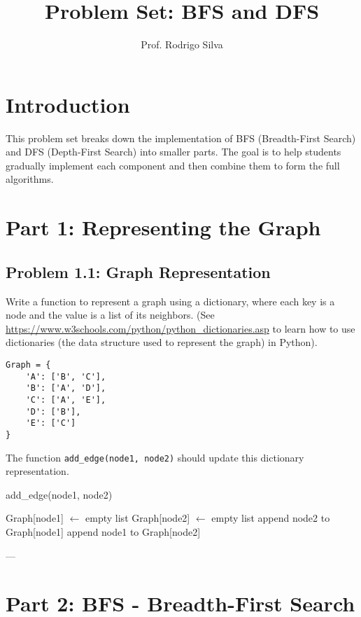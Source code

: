 \documentclass{article}
\title{Problem Set: BFS and DFS}
\author{Prof. Rodrigo Silva}
\date{}
\begin{document}
\maketitle

\section*{Introduction}

This problem set breaks down the implementation of BFS (Breadth-First Search) and DFS (Depth-First Search) into smaller parts. The goal is to help students gradually implement each component and then combine them to form the full algorithms.

\section*{Part 1: Representing the Graph}

\subsection*{Problem 1.1: Graph Representation}

Write a function to represent a graph using a dictionary, where each key is a node and the value is a list of its neighbors. (See \url{https://www.w3schools.com/python/python_dictionaries.asp} to learn how to use dictionaries (the data structure used to represent the graph) in Python).

\begin{verbatim}
Graph = {
    'A': ['B', 'C'],
    'B': ['A', 'D'],
    'C': ['A', 'E'],
    'D': ['B'],
    'E': ['C']
}
\end{verbatim}

The function \texttt{add\_edge(node1, node2)} should update this dictionary representation.

\begin{algorithm}[H]
\caption{add\_edge(node1, node2)}
\begin{algorithmic}
        \STATE Graph[node1] $\gets$ empty list
    \ENDIF
        \STATE Graph[node2] $\gets$ empty list
    \ENDIF
    \STATE append node2 to Graph[node1]
    \STATE append node1 to Graph[node2] 
\end{algorithmic}
\end{algorithm}

---

\section*{Part 2: BFS - Breadth-First Search}
\end{document}
